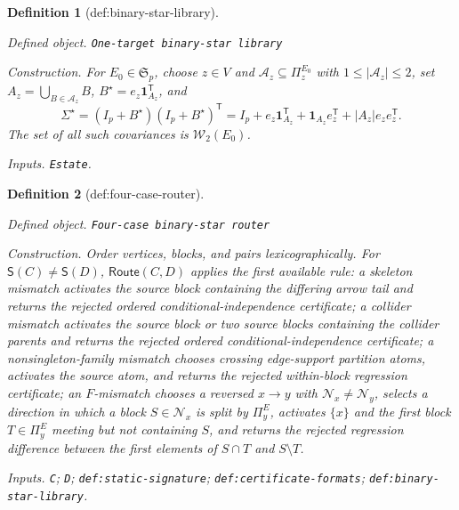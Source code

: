 \documentclass{article}
\newtheorem{definition}{Definition}
\begin{document}
\begin{definition}[def:binary-star-library]\label{def:binary-star-library}
\par\smallskip\noindent\emph{Defined object.} \texttt{One-\allowbreak{}target binary-\allowbreak{}star library}
\par\smallskip\noindent\emph{Construction.} For \(E_0\in\mathfrak S_p\), choose \(z\in V\) and \(\mathcal A_z\subseteq\Pi^{E_0}_z\) with \(1\leq|\mathcal A_z|\leq2\), set \(A_z=\bigcup_{B\in\mathcal A_z}B\), \(B^{\star}=e_z\mathbf 1_{A_z}^{\mathsf T}\), and \[\Sigma^{\star}=(I_p+B^{\star})(I_p+B^{\star})^{\mathsf T}=I_p+e_z\mathbf 1_{A_z}^{\mathsf T}+\mathbf 1_{A_z}e_z^{\mathsf T}+|A_z|e_ze_z^{\mathsf T}.\] The set of all such covariances is \(\mathcal W_2(E_0)\).
\par\smallskip\noindent\emph{Inputs.} \texttt{Estate}.
\end{definition}

\begin{definition}[def:four-case-router]\label{def:four-case-router}
\par\smallskip\noindent\emph{Defined object.} \texttt{Four-\allowbreak{}case binary-\allowbreak{}star router}
\par\smallskip\noindent\emph{Construction.} Order vertices, blocks, and pairs lexicographically. For \(\mathsf S(C)\neq\mathsf S(D)\), \(\mathsf{Route}(C,D)\) applies the first available rule: a skeleton mismatch activates the source block containing the differing arrow tail and returns the rejected ordered conditional-independence certificate; a collider mismatch activates the source block or two source blocks containing the collider parents and returns the rejected ordered conditional-independence certificate; a nonsingleton-family mismatch chooses crossing edge-support partition atoms, activates the source atom, and returns the rejected within-block regression certificate; an \(F\)-mismatch chooses a reversed \(x\to y\) with \(\mathcal N_x\neq\mathcal N_y\), selects a direction in which a block \(S\in\mathcal N_x\) is split by \(\Pi^E_y\), activates \(\{x\}\) and the first block \(T\in\Pi^E_y\) meeting but not containing \(S\), and returns the rejected regression difference between the first elements of \(S\cap T\) and \(S\setminus T\).
\par\smallskip\noindent\emph{Inputs.} \texttt{C}; \texttt{D}; \texttt{def:\allowbreak{}static-\allowbreak{}signature}; \texttt{def:\allowbreak{}certificate-\allowbreak{}formats}; \texttt{def:\allowbreak{}binary-\allowbreak{}star-\allowbreak{}library}.
\end{definition}
\end{document}
